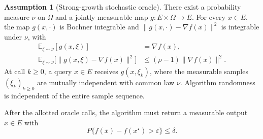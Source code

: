 \documentclass[10pt]{article}
\theoremstyle{definition}
\newtheorem{assumption}{Assumption}
\begin{document}
\begin{assumption}[Strong-growth stochastic oracle]
There exist a probability measure $\nu$ on $\Omega$ and a jointly measurable map $g:E\times\Omega\to E$. For every $x\in E$, the map $g(x,\cdot)$ is Bochner integrable and $\|g(x,\cdot)-\nabla f(x)\|^2$ is integrable under $\nu$, with
\[
\begin{aligned}
\mathbb{E}_{\xi\sim\nu}[g(x,\xi)]&=\nabla f(x),\\
\mathbb{E}_{\xi\sim\nu}\bigl[\|g(x,\xi)-\nabla f(x)\|^2\bigr]
&\leq(\rho-1)\|\nabla f(x)\|^2.
\end{aligned}
\]
At call $k\geq0$, a query $x\in E$ receives $g(x,\xi_k)$, where the measurable samples $(\xi_k)_{k\geq0}$ are mutually independent with common law $\nu$. Algorithm randomness is independent of the entire sample sequence.
\end{assumption}

After the allotted oracle calls, the algorithm must return a measurable output $\bar{x}\in E$ with
\[
P\bigl\{f(\bar{x})-f(x^\star)>\varepsilon\bigr\}\leq\delta.
\]
\end{document}
